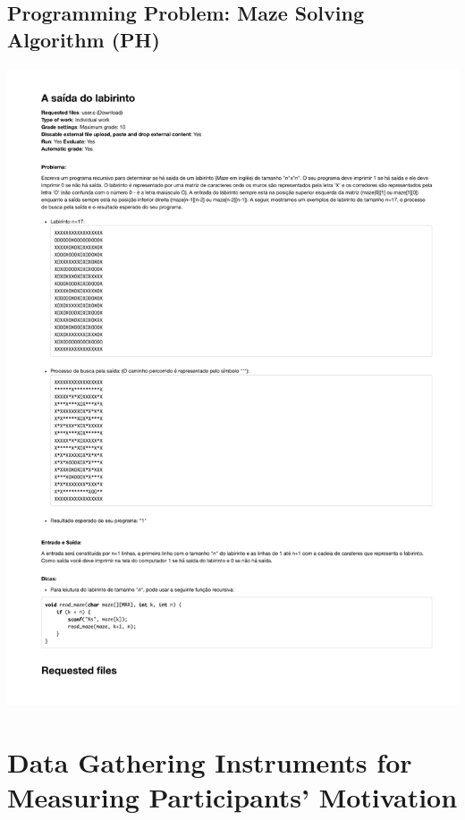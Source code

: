 \section{Programming Problem: Maze Solving Algorithm (PH)}
\label{annex:third-study-pH}
\includegraphics[page=1,width=1\textwidth]{images/annex/third-study-pH.pdf}

\chapter{Data Gathering Instruments for Measuring Participants' Motivation}
\label{annex:data-gathering-instruments-motivation}

